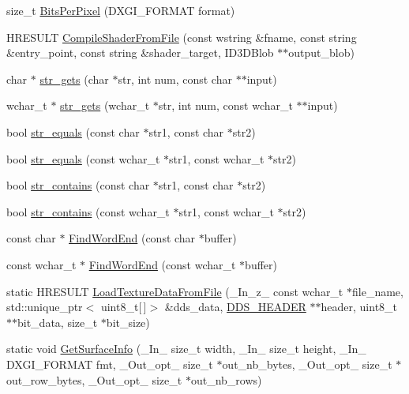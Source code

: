 \begin{DoxyCompactItemize}
\item 
size\+\_\+t \hyperlink{namespacemage_a782fb3970da2fbbc93627f7324c193aa}{Bits\+Per\+Pixel} (D\+X\+G\+I\+\_\+\+F\+O\+R\+M\+AT format)
\item 
H\+R\+E\+S\+U\+LT \hyperlink{namespacemage_af63dbc237d243bcad8b6f2c0a9bb9163}{Compile\+Shader\+From\+File} (const wstring \&fname, const string \&entry\+\_\+point, const string \&shader\+\_\+target, I\+D3\+D\+Blob $\ast$$\ast$output\+\_\+blob)
\item 
char $\ast$ \hyperlink{namespacemage_ab7f63cc8e67ba97382747bc75fd75f62}{str\+\_\+gets} (char $\ast$str, int num, const char $\ast$$\ast$input)
\item 
wchar\+\_\+t $\ast$ \hyperlink{namespacemage_a881ab89db7712612531d47a64c6dfaa1}{str\+\_\+gets} (wchar\+\_\+t $\ast$str, int num, const wchar\+\_\+t $\ast$$\ast$input)
\item 
bool \hyperlink{namespacemage_a4f78f15f269c1f65d4148983bc8224c5}{str\+\_\+equals} (const char $\ast$str1, const char $\ast$str2)
\item 
bool \hyperlink{namespacemage_a0013423e891bc8f522248a6a3f826681}{str\+\_\+equals} (const wchar\+\_\+t $\ast$str1, const wchar\+\_\+t $\ast$str2)
\item 
bool \hyperlink{namespacemage_a5194c40ccd591a8a8926ad7812abcd09}{str\+\_\+contains} (const char $\ast$str1, const char $\ast$str2)
\item 
bool \hyperlink{namespacemage_aac9609117e428765417683338ae8fa73}{str\+\_\+contains} (const wchar\+\_\+t $\ast$str1, const wchar\+\_\+t $\ast$str2)
\item 
const char $\ast$ \hyperlink{namespacemage_ab2e62d950dc620167f4128cb16033998}{Find\+Word\+End} (const char $\ast$buffer)
\item 
const wchar\+\_\+t $\ast$ \hyperlink{namespacemage_a39ee0a00cc5259ed6bb9d1ff85d9fd80}{Find\+Word\+End} (const wchar\+\_\+t $\ast$buffer)
\item 
static H\+R\+E\+S\+U\+LT \hyperlink{namespacemage_ad1df9b8a27dd30528717777fd0c9c3db}{Load\+Texture\+Data\+From\+File} (\+\_\+\+In\+\_\+z\+\_\+ const wchar\+\_\+t $\ast$file\+\_\+name, std\+::unique\+\_\+ptr$<$ uint8\+\_\+t\mbox{[}$\,$\mbox{]}$>$ \&dds\+\_\+data, \hyperlink{structmage_1_1_d_d_s___h_e_a_d_e_r}{D\+D\+S\+\_\+\+H\+E\+A\+D\+ER} $\ast$$\ast$header, uint8\+\_\+t $\ast$$\ast$bit\+\_\+data, size\+\_\+t $\ast$bit\+\_\+size)
\item 
static void \hyperlink{namespacemage_a7b67bb6f38f3e787fb3561d236b88bd2}{Get\+Surface\+Info} (\+\_\+\+In\+\_\+ size\+\_\+t width, \+\_\+\+In\+\_\+ size\+\_\+t height, \+\_\+\+In\+\_\+ D\+X\+G\+I\+\_\+\+F\+O\+R\+M\+AT fmt, \+\_\+\+Out\+\_\+opt\+\_\+ size\+\_\+t $\ast$out\+\_\+nb\+\_\+bytes, \+\_\+\+Out\+\_\+opt\+\_\+ size\+\_\+t $\ast$out\+\_\+row\+\_\+bytes, \+\_\+\+Out\+\_\+opt\+\_\+ size\+\_\+t $\ast$out\+\_\+nb\+\_\+rows)
$$
\end{DoxyCompactItemize}
